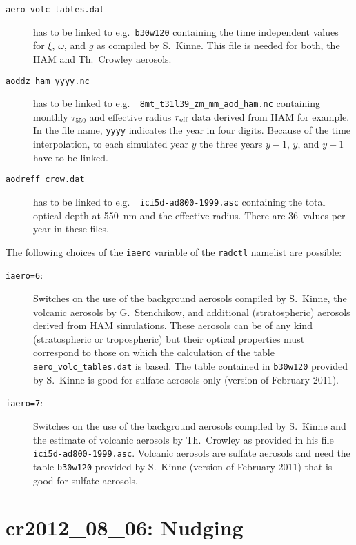 \begin{appendix}
\begin{description}
\item[{\tt aero\_volc\_tables.dat}] has to be linked to e.g.~{\tt b30w120} 
    containing the time independent values for $\xi$, $\omega$, and
    $g$ as compiled by S.~Kinne. This file is needed for both, the HAM
    and Th.~Crowley aerosols.
\item[{\tt aoddz\_ham\_yyyy.nc}] has to be linked to e.g.~{\tt
    8mt\_t31l39\_zm\_mm\_aod\_ham.nc} containing monthly $\tau_{550}$ and
    effective radius $r_{\rm eff}$ data derived from HAM for
    example. In the file name, {\tt yyyy} indicates the year in four
    digits. Because of the time interpolation, to each simulated year
    $y$ the three years $y-1$, $y$, and $y+1$ have to be linked. 
\item[{\tt aodreff\_crow.dat}] has to be linked to e.g.~{\tt
    ici5d-ad800-1999.asc} containing the total optical depth at 550~nm
    and the effective radius. There are 36~values per year in these
    files. 
\end{description}

The following choices of the {\tt iaero} variable of the {\tt radctl}
namelist are possible:

\begin{description}
\item[{\tt iaero=6}:] Switches on the use of the background aerosols
  compiled by S.~Kinne, the volcanic aerosols by G.~Stenchikow, and
  additional (stratospheric) aerosols derived from HAM
  simulations. These aerosols can be of any kind (stratospheric or
  tropospheric) but their optical properties must correspond to those
  on which the calculation of the table {\tt aero\_volc\_tables.dat}
  is based. The table contained in {\tt b30w120} provided by S.~Kinne
  is good for sulfate aerosols only (version of February 2011).
\item[{\tt iaero=7}:] Switches on the use of the background aerosols
  compiled by S.~Kinne and the estimate of volcanic aerosols by
  Th.~Crowley as provided in his file {\tt
    ici5d-ad800-1999.asc}. Volcanic aerosols are sulfate aerosols and
  need the table {\tt b30w120} provided by S.~Kinne (version of
  February 2011) that is good for sulfate aerosols.
\end{description}

\clearpage\newpage
\section{cr2012\_08\_06: Nudging}\label{cr20120806}


\end{appendix}
